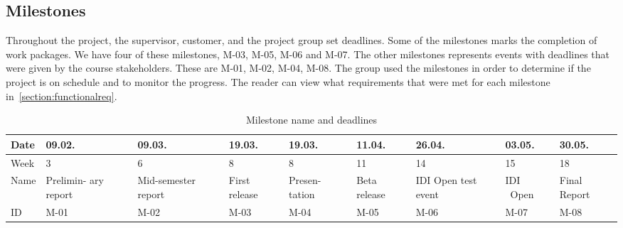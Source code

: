 \pagebreak
\subsection{Milestones}
Throughout the project, the supervisor, customer, and the project group set
deadlines. Some of the milestones marks the completion of work packages. We
have four of these milestones, M-03, M-05, M-06 and M-07. The other milestones
represents events with deadlines that were given by the course stakeholders.
These are M-01, M-02, M-04, M-08. The group used the milestones in order
to determine if the project is on schedule and to monitor the progress.
The reader can view what requirements that were met for each milestone
in~\ref{section:functionalreq}.

\begin{longtable}{|l|p{1.3cm}|p{1.3cm}|p{1.3cm}|p{1.3cm}|p{1.3cm}|p{1.3cm}|p{1.3cm}|p{1.3cm}|}
    \caption{Milestone name and deadlines} \label{table:milestone} \\
\hline

Date & 09.02. & 09.03. & 19.03. & 19.03. & 11.04. & 26.04. & 03.05. & 30.05.\\
\hline

Week & 3 & 6 & 8 & 8 & 11 & 14 & 15 & 18\\
\hline

Name & Prelimin- ary report & Mid-semester report & First release &
Presen- tation & Beta release & IDI Open test event & IDI \ Open & Final Report\\
\hline

ID & M-01 & M-02 & M-03 & M-04 & M-05 & M-06 & M-07 & M-08\\
\hline
\end{longtable}



